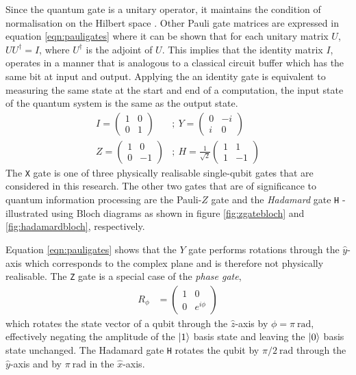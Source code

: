 Since the quantum gate is a unitary operator, it maintains the condition of normalisation on the Hilbert space \cite{Nielsen2010}. Other Pauli gate matrices are expressed in equation \ref{eqn:pauligates} where it can be shown that for each unitary matrix $U$, $UU^\dagger=I$, where $U^\dagger$ is the adjoint of $U$. This implies that the identity matrix $I$, operates in a manner that is analogous to a classical circuit buffer which has the same bit at input and output. Applying the an identity gate is equivalent to measuring the same state at the start and end of a computation, the input state of the quantum system is the same as the output state. 
\begin{align}\label{eqn:pauligates}
	I=\left(\begin{matrix}
		1	& 0\\
		0	& 1
	\end{matrix}\right)&;~Y=\left(\begin{matrix}
	0	& -i\\
	i	& 0
\end{matrix}\right)\nonumber\\
Z=\left(\begin{matrix}
1	& 0\\
0	& -1
\end{matrix}\right)&;~H=\frac{1}{\sqrt{2}}\left(\begin{matrix}
1	& 1\\
1	& -1
\end{matrix}\right)
\end{align}
The \texttt{X} gate is one of three physically realisable single-qubit gates that are considered in this research. The other two gates that are of significance to quantum information processing are the Pauli-$Z$ gate and the \textit{Hadamard} gate \texttt{H} - illustrated using Bloch diagrams as shown in figure \ref{fig:zgatebloch} and \ref{fig:hadamardbloch}, respectively. 

Equation \ref{eqn:pauligates} shows that the $Y$ gate performs rotations through the $\hat{y}$-axis which corresponds to the complex plane and is therefore not physically realisable. The \texttt{Z} gate is a special case of the \textit{phase gate},
\begin{align}
	R_\phi	& = \left(\begin{matrix}
		1	& 0\\
		0	& e^{i\phi}
	\end{matrix}\right)
\end{align}
which rotates the state vector of a qubit through the $\hat{z}$-axis by $\phi=\pi~\si{\radian}$, effectively negating the amplitude of the $\ket{1}$ basis state and leaving the $\ket{0}$ basis state unchanged. The Hadamard gate \texttt{H} rotates the qubit by $\pi/2~\si{\radian}$ through the $\hat{y}$-axis and by $\pi~\si{\radian}$ in the $\hat{x}$-axis.  

